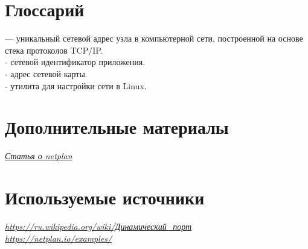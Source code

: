 \documentclass[14pt, a4paper]{article}
\begin{document}
\newpage

\section*{Глоссарий} 

\href{https://ru.wikipedia.org/wiki/IP-адрес}{} — уникальный сетевой адрес узла в компьютерной сети, построенной на основе стека
протоколов TCP/IP.\\

\noindent \href{https://ru.wikipedia.org/wiki/Порт_(компьютерные_сети)}{} - сетевой идентификатор приложения.\\

\noindent \href{https://ru.wikipedia.org/wiki/MAC-адрес}{} - адрес сетевой карты.\\

\noindent \href{https://netplan.io/}{} - утилита для настройки сети в Linux.

\section*{Дополнительные материалы} 

\href{https://habr.com/ru/post/448400/}{\textit{Статья о netplan}}

\section*{Используемые источники} 

\href{https://ru.wikipedia.org/wiki/Динамический_порт}{\textit{https://ru.wikipedia.org/wiki/Динамический\_порт}}\\
\href{https://netplan.io/examples/}{\textit{https://netplan.io/examples/}}
\end{document}
